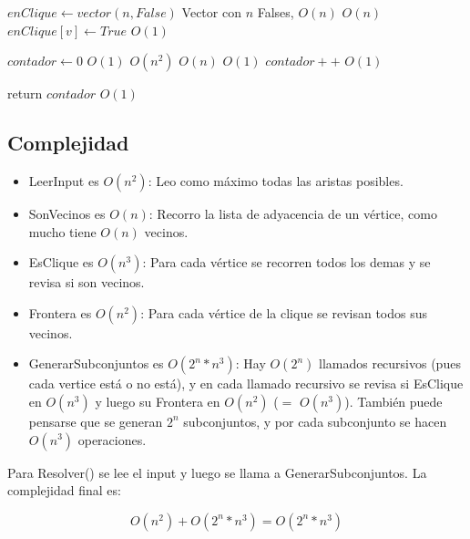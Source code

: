 \begin{algorithm}[H]
\begin{algorithmic}
    \State $enClique \gets vector(n, False)$ \Comment Vector con $n$ Falses, $O(n)$
                        \Comment $O(n)$
        \State $enClique[v] \gets True$      \Comment $O(1)$
    \EndFor

    \State $contador \gets 0$                \Comment $O(1)$
                         \Comment $O(n^2)$
                \Comment $O(n)$
                 \Comment $O(1)$
                \State $contador++$          \Comment $O(1)$
            \EndIf
        \EndFor
    \EndFor

    \State return $contador$                 \Comment $O(1)$

\EndFunction
\end{algorithmic}
\end{algorithm}

\subsection{Complejidad}

\begin{itemize}
    \item LeerInput es $O(n^2)$: Leo como máximo todas las aristas posibles.
    \item SonVecinos es $O(n)$: Recorro la lista de adyacencia de un vértice, como mucho tiene $O(n)$ vecinos.
    \item EsClique es $O(n^{3})$: Para cada vértice se recorren todos los demas y se revisa si son vecinos.
    \item Frontera es $O(n^{2})$: Para cada vértice de la clique se revisan todos sus vecinos.
    \item GenerarSubconjuntos es $O(2^{n} * n^{3})$: Hay $O(2^n)$ llamados recursivos (pues cada vertice está o no está), y en cada llamado recursivo se revisa si EsClique en $O(n^3)$ y luego su Frontera en $O(n^2)$ ($=$ $O(n^3)$). También puede pensarse que se generan $2^n$ subconjuntos, y por cada subconjunto se hacen $O(n^3)$ operaciones.
\end{itemize}

Para Resolver() se lee el input y luego se llama a GenerarSubconjuntos. La complejidad final es:

$$ O(n^2) + O(2^{n} * n^{3}) = O(2^{n} * n^{3})$$
